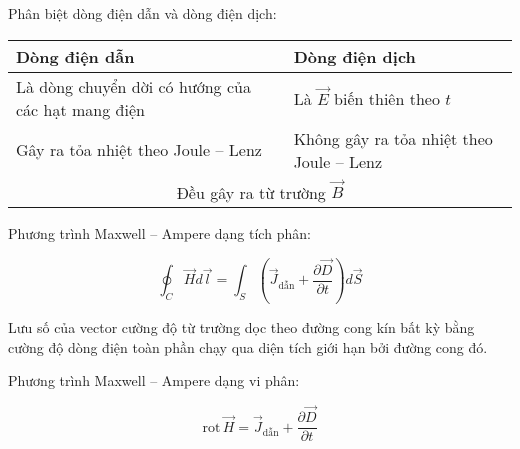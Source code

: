 Phân biệt dòng điện dẫn và dòng điện dịch:

\begin{table}[H]
\centering
\begin{tabular}{|p{6cm}p{6cm}|}
\hline
\multicolumn{1}{|p{6cm}|}{ Dòng điện dẫn  }& Dòng điện dịch \\ \hline\hline
\multicolumn{1}{|p{6cm}|}{ Là dòng chuyển dời có hướng của các hạt mang điện  }& Là $\vec{E}$ biến thiên theo $t$ \\ \hline
\multicolumn{1}{|p{6cm}|}{ Gây ra tỏa nhiệt theo Joule -- Lenz  }& Không gây ra tỏa nhiệt theo Joule -- Lenz \\ \hline
\multicolumn{2}{|c|}{Đều gây ra từ trường $\vec{B}$} \\ \hline
\end{tabular}
\end{table}

Phương trình Maxwell -- Ampere dạng tích phân:

\begin{equation*}
  \oint_C \vec{H}d\vec{l} = \int_S \left( \vec{J}_{\text{dẫn}} + \frac{\partial \vec{D}}{\partial t} \right) d\vec{S}
\end{equation*}

Lưu số của vector cường độ từ trường dọc theo đường cong kín bất kỳ bằng cường độ dòng điện toàn phần chạy qua diện tích giới hạn bởi đường cong đó.

Phương trình Maxwell -- Ampere dạng vi phân:

\begin{equation*}
  \text{rot}\,\vec{H} = \vec{J}_{\text{dẫn}} + \frac{\partial \vec{D}}{\partial t}
\end{equation*}